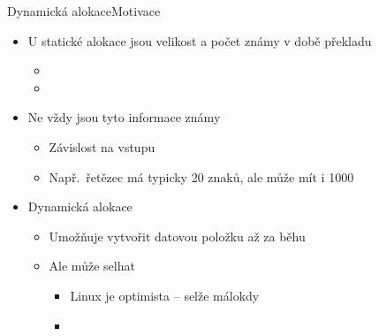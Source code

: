 
\begin{frame}{Dynamická alokace}{Motivace}

  \begin{itemize}
    \item U statické alokace jsou velikost a počet známy v době překladu
    \begin{itemize}
      \item {}
      \item {}
    \end{itemize}

    \pause

    \item Ne vždy jsou tyto informace známy
    \begin{itemize}
      \item Závislost na vstupu
      \item Např.\ řetězec má typicky 20 znaků, ale může mít i 1000
    \end{itemize}

    \pause

    \item Dynamická alokace
    \begin{itemize}
      \item Umožňuje vytvořit datovou položku až za běhu

      \pause

      \item Ale může selhat
      \begin{itemize}
	\item Linux je optimista -- selže málokdy
	\item {}
      \end{itemize}
    \end{itemize}
  \end{itemize}

\end{frame}

